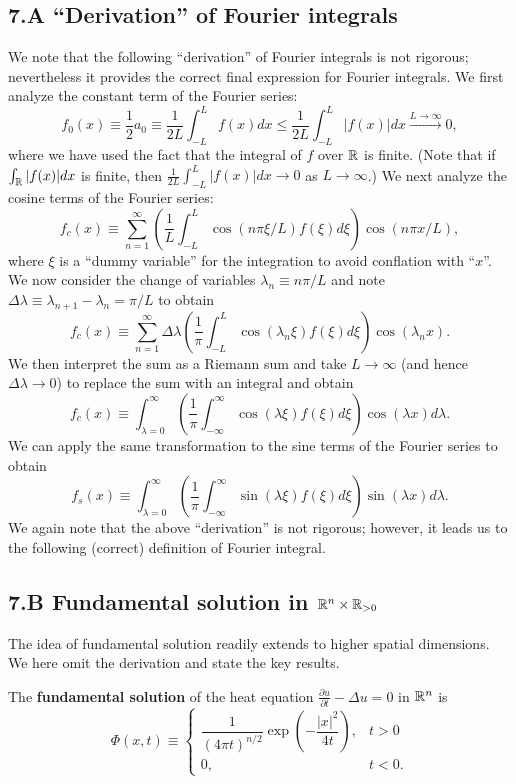 \subsection{7.A ``Derivation'' of Fourier integrals}
We note that the following ``derivation'' of Fourier integrals is not rigorous; nevertheless it provides the correct final expression for Fourier integrals. We first analyze the constant term of the Fourier series:
\[f_0(x) \equiv \frac{1}{2} a_0 \equiv \frac{1}{2L} \int_{-L}^{L} f(x) dx \leq \frac{1}{2L} \int_{-L}^{L} |f(x)| dx \xrightarrow{L \to \infty} 0,\]
where we have used the fact that the integral of $f$ over $\mathbb{R}$ is finite. (Note that if $\int_{\mathbb{R}} |f(x)| dx$ is finite, then $\frac{1}{2L} \int_{-L}^{L} |f(x)| dx \to 0$ as $L \to \infty$.) We next analyze the cosine terms of the Fourier series:
\[f_c(x) \equiv \sum_{n=1}^{\infty} \left(\frac{1}{L} \int_{-L}^{L} \cos(n\pi\xi/L) f(\xi) d\xi\right) \cos(n\pi x/L),\]
where $\xi$ is a ``dummy variable'' for the integration to avoid conflation with ``$x$''. We now consider the change of variables $\lambda_n \equiv n\pi/L$ and note $\Delta\lambda \equiv \lambda_{n+1} - \lambda_n = \pi/L$ to obtain
\[f_c(x) \equiv \sum_{n=1}^{\infty} \Delta\lambda \left(\frac{1}{\pi} \int_{-L}^{L} \cos(\lambda_n \xi) f(\xi) d\xi\right) \cos(\lambda_n x).\]
We then interpret the sum as a Riemann sum and take $L \to \infty$ (and hence $\Delta\lambda \to 0$) to replace the sum with an integral and obtain
\[f_c(x) \equiv \int_{\lambda=0}^{\infty} \left(\frac{1}{\pi} \int_{-\infty}^{\infty} \cos(\lambda\xi) f(\xi) d\xi\right) \cos(\lambda x) d\lambda.\]
We can apply the same transformation to the sine terms of the Fourier series to obtain
\[f_s(x) \equiv \int_{\lambda=0}^{\infty} \left(\frac{1}{\pi} \int_{-\infty}^{\infty} \sin(\lambda\xi) f(\xi) d\xi\right) \sin(\lambda x) d\lambda.\]
We again note that the above ``derivation'' is not rigorous; however, it leads us to the following (correct) definition of Fourier integral.

\subsection{7.B Fundamental solution in $\mathbb{R}^n \times \mathbb{R}_{>0}$}
The idea of fundamental solution readily extends to higher spatial dimensions. We here omit the derivation and state the key results.

\begin{definition}
    The \textbf{fundamental solution} of the heat equation $\frac{\partial u}{\partial t} - \Delta u = 0$ in $\mathbb{R}^n$ is
    \[\Phi(x, t) \equiv \begin{cases} \dfrac{1}{(4\pi t)^{n/2}} \exp\left(-\dfrac{|x|^2}{4t}\right), & t > 0 \\ 0, & t < 0. \end{cases}\]
\end{definition}

